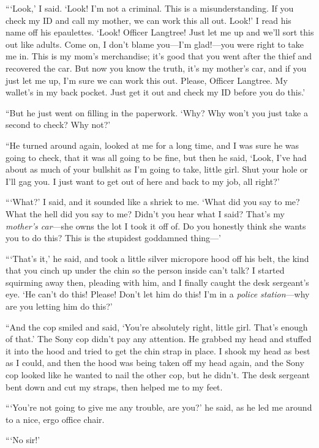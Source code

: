 “‘Look,’ I said. ‘Look! I’m not a criminal. This is a
misunderstanding. If you check my ID and call my mother, we can
work this all out. Look!’ I read his name off his epaulettes.
‘Look! Officer Langtree! Just let me up and we’ll sort this out
like adults. Come on, I don’t blame you—I’m glad!—you were right to
take me in. This is my mom’s merchandise; it’s good that you went
after the thief and recovered the car. But now you know the truth,
it’s my mother’s car, and if you just let me up, I’m sure we can
work this out. Please, Officer Langtree. My wallet’s in my back
pocket. Just get it out and check my ID before you do this.’

“But he just went on filling in the paperwork. ‘Why? Why won’t you
just take a second to check? Why not?’

“He turned around again, looked at me for a long time, and I was
sure he was going to check, that it was all going to be fine, but
then he said, ‘Look, I’ve had about as much of your bullshit as I’m
going to take, little girl. Shut your hole or I’ll gag you. I just
want to get out of here and back to my job, all right?’

“‘What?’ I said, and it sounded like a shriek to me. ‘What did you
say to me? What the hell did you say to me? Didn’t you hear what I
said? That’s my \emph{mother’s car}—she owns the lot I took it off
of. Do you honestly think she wants you to do this? This is the
stupidest goddamned thing—’

“‘That’s it,’ he said, and took a little silver micropore hood off
his belt, the kind that you cinch up under the chin so the person
inside can’t talk? I started squirming away then, pleading with
him, and I finally caught the desk sergeant’s eye. ‘He can’t do
this! Please! Don’t let him do this! I’m in a
\emph{police station}—why are you letting him do this?’

“And the cop smiled and said, ‘You’re absolutely right, little
girl. That’s enough of that.’ The Sony cop didn’t pay any
attention. He grabbed my head and stuffed it into the hood and
tried to get the chin strap in place. I shook my head as best as I
could, and then the hood was being taken off my head again, and the
Sony cop looked like he wanted to nail the other cop, but he
didn’t. The desk sergeant bent down and cut my straps, then helped
me to my feet.

“‘You’re not going to give me any trouble, are you?’ he said, as he
led me around to a nice, ergo office chair.

“‘No sir!’

